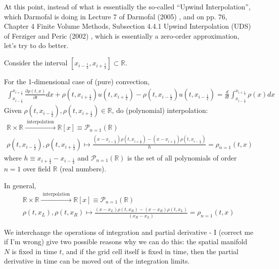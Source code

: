 \documentclass[10pt]{amsart}
\begin{document}
\begin{multicols*}{2}
At this point, instead of what is essentially the so-called ``Upwind Interpolation'', which Darmofal is doing in Lecture 7 of Darmofal (2005) \cite{Darm2005}, and on pp. 76, Chapter 4 Finite Volume Methods, Subsection 4.4.1 Upwind Interpolation (UDS) of Ferziger and Peric (2002) \cite{FP2013}, which is essentially a zero-order approximation, let's try to do better.  

Consider the interval $[x_{i-\frac{1}{2}}, x_{i+\frac{1}{2} } ] \subset \mathbb{R}$.

For the 1-dimensional case of (pure) convection,
\[
\begin{gathered}
  \int_{x_{i - \frac{1}{2}}}^{x_{i+\frac{1}{2} } } \frac{ \partial \rho (t,x) }{ \partial t } dx + \rho(t,x_{ i +\frac{1}{2} } ) u(t,x_{i +\frac{1}{2} } ) - \rho(t, x_{i -\frac{1}{2} } )u(t,x_{i -\frac{1}{2}} ) = \frac{d}{dt} \int_{x_{i -\frac{1}{2} } }^{ x_{i +\frac{1}{2} } } \rho(x) dx
  \end{gathered}
\]
Given $\rho(t,x_{i -\frac{1}{2} }), \rho(t, x_{i +\frac{1}{2} }) \in \mathbb{R}$, do (polynomial) interpolation:
\[
\begin{gathered}
  \mathbb{R} \times \mathbb{R} \xrightarrow{ \text{ interpolation }} \mathbb{R}[x] \equiv \mathcal{P}_{n=1}(\mathbb{R}) \\ 
 \rho(t,x_{i -\frac{1}{2} }), \rho(t, x_{i +\frac{1}{2} }) \mapsto \frac{ (x - x_{ i -\frac{1}{2}}) \rho(t, x_{i +\frac{1}{2}}) - (x - x_{i +\frac{1}{2}} )\rho(t,x_{i -\frac{1}{2}}) }{ h } = \rho_{n=1}(t,x)
\end{gathered}
\]
where $h \equiv x_{i +\frac{1}{2}} - x_{i -\frac{1}{2}}$ and $\mathcal{P}_{n=1}(\mathbb{R})$ is the set of all polynomials of order $n=1$ over field $\mathbb{R}$ (real numbers).

In general,
\[
\begin{gathered}
  \mathbb{R} \times \mathbb{R} \xrightarrow{ \text{ interpolation }} \mathbb{R}[x] \equiv \mathcal{P}_{n=1}(\mathbb{R}) \\ 
 \rho(t,x_L), \rho(t, x_R) \mapsto \frac{ (x - x_L ) \rho(t, x_R) - (x - x_R )\rho(t,x_L) }{ (x_R-x_L) } = \rho_{n=1}(t,x)
\end{gathered}
\]


We interchange the operations of integration and partial derivative - I (correct me if I'm wrong) give two possible reasons why we can do this: the spatial manifold $N$ is fixed in time $t$, and if the grid cell itself is fixed in time, then the partial derivative in time can be moved out of the integration limits.


\end{multicols*}
\end{document}
